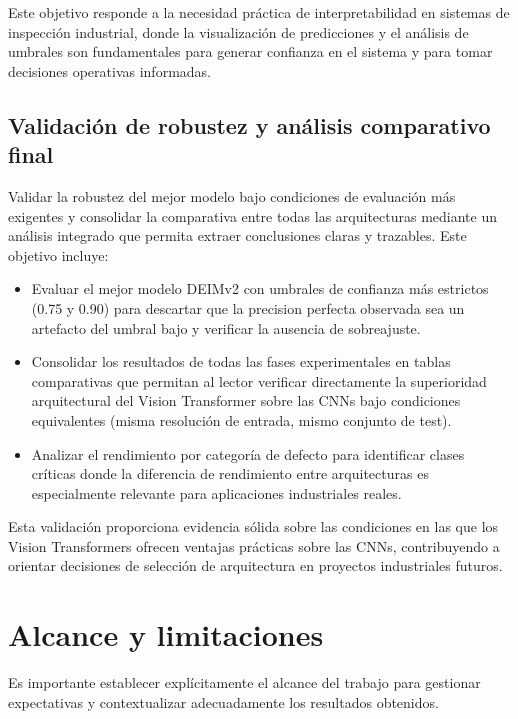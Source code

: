 Este objetivo responde a la necesidad práctica de interpretabilidad en sistemas de inspección industrial, donde la visualización de predicciones y el análisis de umbrales son fundamentales para generar confianza en el sistema y para tomar decisiones operativas informadas.

\subsection{Validación de robustez y análisis comparativo final}

Validar la robustez del mejor modelo bajo condiciones de evaluación más exigentes y consolidar la comparativa entre todas las arquitecturas mediante un análisis integrado que permita extraer conclusiones claras y trazables. Este objetivo incluye:

\begin{itemize}
    \item Evaluar el mejor modelo DEIMv2 con umbrales de confianza más estrictos (0.75 y 0.90) para descartar que la precision perfecta observada sea un artefacto del umbral bajo y verificar la ausencia de sobreajuste.

    \item Consolidar los resultados de todas las fases experimentales en tablas comparativas que permitan al lector verificar directamente la superioridad arquitectural del Vision Transformer sobre las CNNs bajo condiciones equivalentes (misma resolución de entrada, mismo conjunto de test).
    
    \item Analizar el rendimiento por categoría de defecto para identificar clases críticas donde la diferencia de rendimiento entre arquitecturas es especialmente relevante para aplicaciones industriales reales.
\end{itemize}

Esta validación proporciona evidencia sólida sobre las condiciones en las que los Vision Transformers ofrecen ventajas prácticas sobre las CNNs, contribuyendo a orientar decisiones de selección de arquitectura en proyectos industriales futuros.


\section{Alcance y limitaciones}

Es importante establecer explícitamente el alcance del trabajo para gestionar expectativas y contextualizar adecuadamente los resultados obtenidos.

